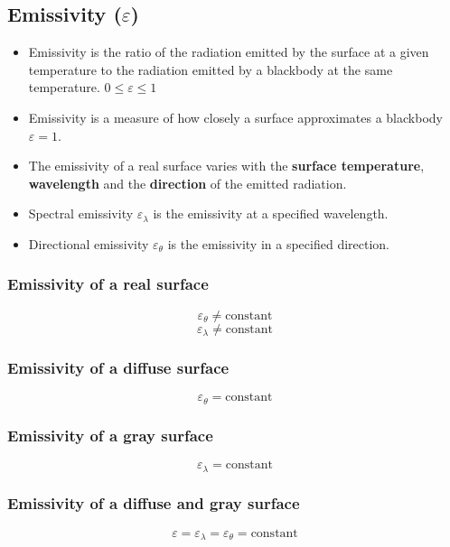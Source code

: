 \documentclass[11pt]{article}
\begin{document}
\subsection{Emissivity (\(\varepsilon\))}
\label{sec:orgc671b60}
\begin{itemize}
\item Emissivity is the ratio of the radiation emitted by the surface at a given temperature to the radiation emitted by a blackbody at the same temperature. \(0 \le \varepsilon \le 1\)
\item Emissivity is a measure of how closely a surface approximates a blackbody \(\varepsilon = 1\).
\item The emissivity of a real surface varies with the \textbf{surface temperature}, \textbf{wavelength} and the \textbf{direction} of the emitted radiation.
\item Spectral emissivity \(\varepsilon_{\lambda}\) is the emissivity at a specified wavelength.
\item Directional emissivity \(\varepsilon_{\theta}\) is the emissivity in a specified direction.
\end{itemize}
\subsubsection{Emissivity of a real surface}
\label{sec:org7ce24d0}
\[\varepsilon_{\theta} \ne \text{constant}\]
\[\varepsilon_{\lambda} \ne \text{constant}\]
\subsubsection{Emissivity of a diffuse surface}
\label{sec:org8252419}
\[\varepsilon_{\theta} = \text{constant}\]
\subsubsection{Emissivity of a gray surface}
\label{sec:org7ffa13c}
\[\varepsilon_{\lambda} = \text{constant}\]
\subsubsection{Emissivity of a diffuse and gray surface}
\label{sec:org778b593}
\[\varepsilon = \varepsilon_{\lambda} = \varepsilon_{\theta} = \text{constant}\]
\end{document}
